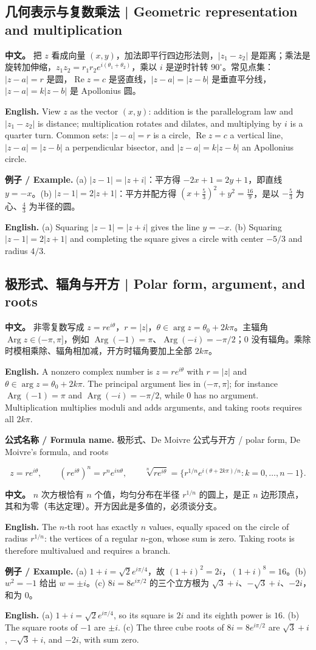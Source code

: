 \documentclass[UTF8,11pt,a4paper]{ctexart}
\newcommand{\EN}[1]{\par\noindent \textbf{English.} #1\par}
\newcommand{\FORMULA}[2]{\par\noindent\textbf{公式名称 / Formula name.} #1 / #2\par}
\newcommand{\EX}[2]{\par\noindent \textbf{例子 / Example.} #1\par\EN{#2}}
\newcommand{\APS}[2]{\par\noindent\textbf{中文。} #1\par\noindent\textbf{English.} #2\par\smallskip}
\begin{document}
\subsection{几何表示与复数乘法 | Geometric representation and multiplication}
\APS{把 $z$ 看成向量 $(x,y)$，加法即平行四边形法则，$|z_1-z_2|$ 是距离；乘法是旋转加伸缩，$z_1z_2=r_1r_2e^{i(\theta_1+\theta_2)}$，乘以 $i$ 是逆时针转 $90^\circ$。常见点集：$|z-a|=r$ 是圆，$\operatorname{Re}z=c$ 是竖直线，$|z-a|=|z-b|$ 是垂直平分线，$|z-a|=k|z-b|$ 是 Apollonius 圆。}{View $z$ as the vector $(x,y)$: addition is the parallelogram law and $|z_1-z_2|$ is distance; multiplication rotates and dilates, and multiplying by $i$ is a quarter turn. Common sets: $|z-a|=r$ is a circle, $\operatorname{Re}z=c$ a vertical line, $|z-a|=|z-b|$ a perpendicular bisector, and $|z-a|=k|z-b|$ an Apollonius circle.}
\EX{(a) $|z-1|=|z+i|$：平方得 $-2x+1=2y+1$，即直线 $y=-x$。(b) $|z-1|=2|z+1|$：平方并配方得 $(x+\frac53)^2+y^2=\frac{16}{9}$，是以 $-\frac53$ 为心、$\frac43$ 为半径的圆。}{(a) Squaring $|z-1|=|z+i|$ gives the line $y=-x$. (b) Squaring $|z-1|=2|z+1|$ and completing the square gives a circle with center $-5/3$ and radius $4/3$.}

\subsection{极形式、辐角与开方 | Polar form, argument, and roots}
\APS{非零复数写成 $z=re^{i\theta}$，$r=|z|$，$\theta\in\arg z=\theta_0+2k\pi$。主辐角 $\operatorname{Arg}z\in(-\pi,\pi]$，例如 $\operatorname{Arg}(-1)=\pi$、$\operatorname{Arg}(-i)=-\pi/2$；$0$ 没有辐角。乘除时模相乘除、辐角相加减，开方时辐角要加上全部 $2k\pi$。}{A nonzero complex number is $z=re^{i\theta}$ with $r=|z|$ and $\theta\in\arg z=\theta_0+2k\pi$. The principal argument lies in $(-\pi,\pi]$; for instance $\operatorname{Arg}(-1)=\pi$ and $\operatorname{Arg}(-i)=-\pi/2$, while $0$ has no argument. Multiplication multiplies moduli and adds arguments, and taking roots requires all $2k\pi$.}
\FORMULA{极形式、De Moivre 公式与开方}{polar form, De Moivre's formula, and roots}
\[
z=re^{i\theta},\qquad (re^{i\theta})^n=r^ne^{in\theta},\qquad
\sqrt[n]{re^{i\theta}}=\{r^{1/n}e^{i(\theta+2k\pi)/n}:k=0,\dots,n-1\}.
\]
\APS{$n$ 次方根恰有 $n$ 个值，均匀分布在半径 $r^{1/n}$ 的圆上，是正 $n$ 边形顶点，其和为零（韦达定理）。开方因此是多值的，必须谈分支。}{The $n$-th root has exactly $n$ values, equally spaced on the circle of radius $r^{1/n}$: the vertices of a regular $n$-gon, whose sum is zero. Taking roots is therefore multivalued and requires a branch.}
\EX{(a) $1+i=\sqrt2e^{i\pi/4}$，故 $(1+i)^2=2i$，$(1+i)^8=16$。(b) $w^2=-1$ 给出 $w=\pm i$。(c) $8i=8e^{i\pi/2}$ 的三个立方根为 $\sqrt3+i$、$-\sqrt3+i$、$-2i$，和为 $0$。}{(a) $1+i=\sqrt2e^{i\pi/4}$, so its square is $2i$ and its eighth power is $16$. (b) The square roots of $-1$ are $\pm i$. (c) The three cube roots of $8i=8e^{i\pi/2}$ are $\sqrt3+i$, $-\sqrt3+i$, and $-2i$, with sum zero.}
\end{document}
